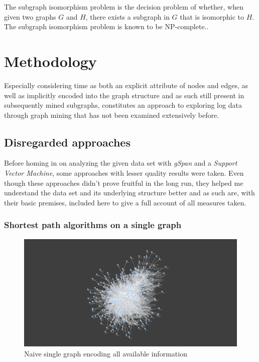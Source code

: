 \documentclass[pdftex,12pt,a4paper]{report}
\begin{document}
The subgraph isomorphism problem is the decision problem of whether, when given two graphs $G$ and $H$, there exists a subgraph in $G$ that is isomorphic to $H$. The subgraph isomorphism problem is known to be NP-complete.\cite{Cook1971-fj}.

\chapter{Methodology}
Especially considering time as both an explicit attribute of nodes and edges, as well as implicitly encoded into the graph structure and as such still present in subsequently mined subgraphs, constitutes an approach to exploring log data through graph mining that has not been examined extensively before.

\section{Disregarded approaches}
Before homing in on analyzing the given data set with \textit{gSpan} and a \textit{Support Vector Machine}, some approaches with lesser quality results were taken. Even though these approaches didn't prove fruitful in the long run, they helped me understand the data set and its underlying structure better and as such are, with their basic premises, included here to give a full account of all measures taken.

\subsection{Shortest path algorithms on a single graph}
\begin{figure}
	\centering
	\noindent\includegraphics[width=\linewidth]{images/fullgraph}
	\caption{Naive single graph encoding all available information}
	\label{fig:fullgraph}
\end{figure}
\end{document}
